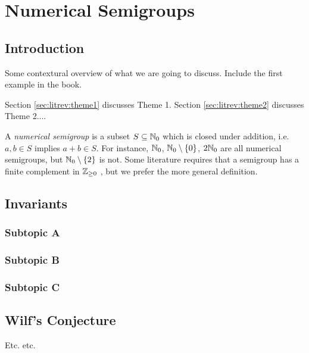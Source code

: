 \chapter{Numerical Semigroups}\label{chap:probmet}

\section{Introduction}\label{sec:smgps:intro}

Some contextural overview of what we are going to discuss. Include the first example in the book. 

Section \ref{sec:litrev:theme1} discusses Theme 1. Section \ref{sec:litrev:theme2} discusses Theme 2....

A \textit{numerical semigroup} is a subset $S \subseteq \mathbb{N}_{0}$ which is closed under addition, i.e. $a, b \in S$ implies $a + b \in S$. For instance, $\mathbb{N}_0$, $\mathbb{N}_0 \setminus \{0\}$, $2\mathbb{N}_0$ are all numerical semigroups, but $\mathbb{N}_0 \setminus \{2\}$ is not. Some literature requires that a semigroup has a finite complement in $\mathbb{Z}_{\geq 0}$ \cite{chapman2020beyond}, but we prefer the more general definition. 


\section{Invariants}\label{sec:smgps:theme1}


\subsection{Subtopic A}\label{sec:smgps:theme1:A}

\subsection{Subtopic B}\label{sec:smgps:theme1:B}

\subsection{Subtopic C}\label{sec:smgps:theme1:C}

\section{Wilf's Conjecture}\label{sec:smgps:theme2}

Etc. etc.
